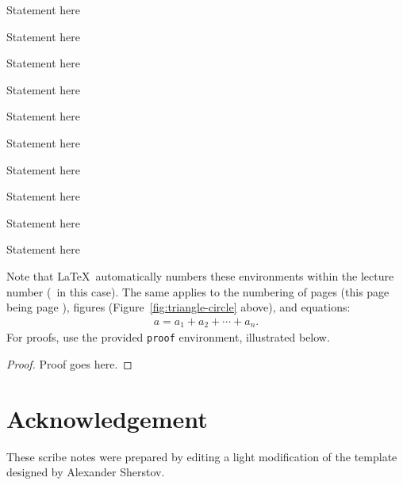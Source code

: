 \documentclass[usletter]{article}
\begin{document}
\begin{proposition}
Statement here
\end{proposition}

\begin{fact}
Statement here
\end{fact}

\begin{claim}
Statement here
\end{claim}

\begin{definition}
Statement here
\end{definition}

\begin{example}
Statement here
\end{example}

\begin{assumption}
Statement here
\end{assumption}

\begin{remark}
Statement here
\end{remark}

\begin{conjecture}
Statement here
\end{conjecture}

\begin{openproblem}
Statement here
\end{openproblem}

\begin{problem}
Statement here
\end{problem}


\noindent
Note that \LaTeX\ automatically numbers these
environments within the lecture number (\thelecture\ in
this case).  The same applies to the numbering of pages
(this page being page \thepage), figures
(Figure~\ref{fig:triangle-circle} above), and
equations:
\begin{align}
a = a_1+a_2+\cdots+a_n.
\end{align}
\noindent
For proofs, use the provided {\tt proof} environment,
illustrated below.

\begin{proof}
Proof goes here.
\end{proof}

\section*{Acknowledgement}
These scribe notes were prepared by editing a light modification of the template designed by Alexander Sherstov.



\end{document}
